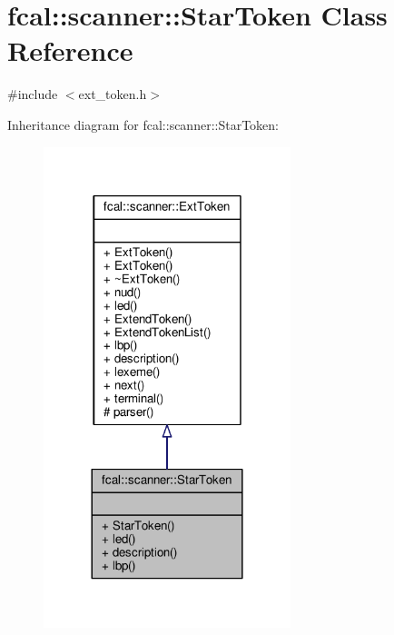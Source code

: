 \hypertarget{classfcal_1_1scanner_1_1StarToken}{}\section{fcal\+:\+:scanner\+:\+:Star\+Token Class Reference}
\label{classfcal_1_1scanner_1_1StarToken}


{\ttfamily \#include $<$ext\+\_\+token.\+h$>$}



Inheritance diagram for fcal\+:\+:scanner\+:\+:Star\+Token\+:
\nopagebreak
\begin{figure}[H]
\begin{center}
\leavevmode
\includegraphics[width=204pt]{classfcal_1_1scanner_1_1StarToken__inherit__graph}
\end{center}
\end{figure}


